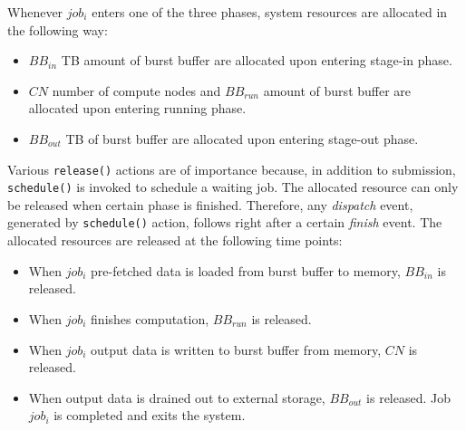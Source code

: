 Whenever $job_i$ enters one of the three phases, 
system resources are allocated in the following way:
\begin{itemize}
        \item $BB_{in}$ TB amount of burst buffer are allocated upon entering stage-in phase.
        \item $CN$ number of compute nodes and $BB_{run}$ amount of burst buffer
                are allocated upon entering running phase.
        \item $BB_{out}$ TB of burst buffer are allocated upon entering stage-out phase.
\end{itemize}
Various \texttt{release()} actions are of importance because, in addition to submission,
\texttt{schedule()} is invoked to schedule a waiting job. 
The allocated resource can only be released when certain phase is finished. 
Therefore, any \textit{dispatch} event, generated by \texttt{schedule()} action, 
follows right after a certain \textit{finish} event.
The allocated resources are released at the following time points:
\begin{itemize}
        \item When $job_i$ pre-fetched data is loaded from burst buffer to memory,
	      $BB_{in}$ is released.
        \item When $job_i$ finishes computation, 
	      $BB_{run}$ is released.
        \item When $job_i$ output data is written to burst buffer from memory,
	      $CN$ is released.
        \item When output data is drained out to external storage,
	      $BB_{out}$ is released.
                Job $job_i$ is completed and exits the system.
\end{itemize}




